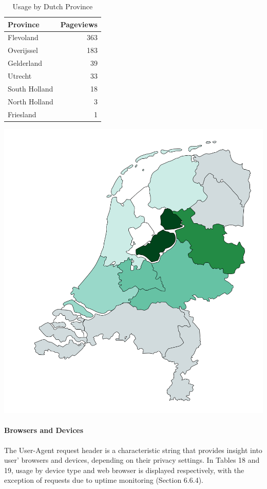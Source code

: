 \documentclass{article}
\begin{document}
\begin{table}[!htb]
	\begin{minipage}{.5\linewidth}
		\caption{Usage by Dutch Province}
		\centering
		\begin{tabular}{lr}
			\hline
			\textbf{Province} & \textbf{Pageviews} \\
			\hline
			Flevoland         & 363                \\
			Overijssel        & 183                \\
			Gelderland        & 39                 \\
			Utrecht           & 33                 \\
			South Holland     & 18                 \\
			North Holland     & 3                  \\
			Friesland         & 1                  \\
			\hline
		\end{tabular}
	\end{minipage}%
	\hspace{.1cm}
	\begin{minipage}{.5\linewidth}
		\centering
		\centering
		\includegraphics[width=0.66\linewidth]{location-netherlands.png}
		\label{fig:test2}
	\end{minipage} 
\end{table}

\paragraph{Browsers and Devices} The User-Agent request header is a characteristic string that provides insight into user' browsers and devices, depending on their privacy settings. In Tables 18 and 19, usage by device type and web browser is displayed respectively, with the exception of requests due to uptime monitoring (Section 6.6.4). 
\end{document}
